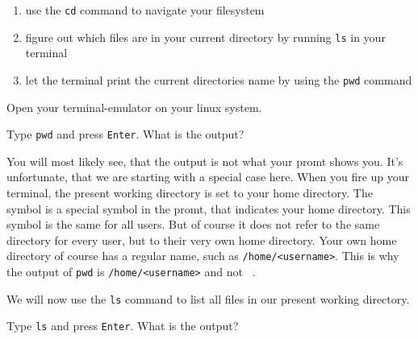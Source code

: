 \begin{challenge}
\begin{chadescription}
    
    \begin{enumerate}
        \item use the \texttt{cd} command to navigate your filesystem
        \item figure out which files are in your current directory by running \texttt{ls} in your terminal
        \item let the terminal print the current directories name by using the \texttt{pwd} command
    \end{enumerate}
    \end{chadescription}

    \begin{task}
    Open your terminal-emulator on your linux system.
        \begin{questions}
            \item Type \texttt{pwd} and press \texttt{Enter}. What is the output?
        \end{questions}
    You will most likely see, that the output is not what your promt shows you. 
    It's unfortunate, that we are starting with a special case here.
    When you fire up your terminal, the present working directory is set to your home directory.
    The \texttt{~} symbol is a special symbol in the promt, that indicates your home directory.
    This symbol is the same for all users. 
    But of course it does not refer to the same directory for every user, but to their very own home directory.
    Your own home directory of course has a regular name, such as \texttt{/home/<username>}.
    This is why the output of \texttt{pwd} is \texttt{/home/<username>} and not \texttt{~}.
    \end{task}

    \begin{task}
        We will now use the \texttt{ls} command to list all files in our present working directory.
        \begin{questions}
            \item Type \texttt{ls} and press \texttt{Enter}. What is the output?
        \end{questions}
    \end{task}


\end{challenge}
